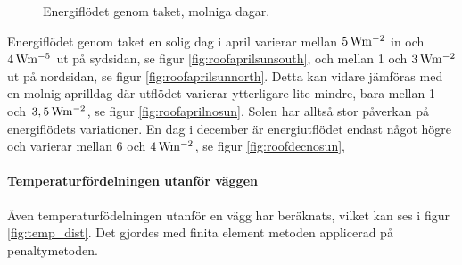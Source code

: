 \begin{figure}[hpbt]
\centering
{}

\caption{\label{fig:rooffigurescloud}Energiflödet genom taket, molniga dagar.}
\end{figure}

Energiflödet genom taket en solig dag i april varierar mellan $\unit[5]{W m^{-2}}$ in och $\unit[4]{W m^{-5}}$ ut på sydsidan, se figur \ref{fig:roofaprilsunsouth}, och mellan 1 och $\unit[3]{W m^{-2}}$ ut på nordsidan, se figur \ref{fig:roofaprilsunnorth}. Detta kan vidare jämföras med en molnig aprilldag där utflödet varierar ytterligare lite mindre, bara mellan 1 och $\unit[3,5]{W m^{-2}}$, se figur \ref{fig:roofaprilnosun}. Solen har alltså stor påverkan på energiflödets variationer. En dag i december är energiutflödet endast något högre och varierar mellan 6 och $\unit[4]{W m^{-2}}$, se figur \ref{fig:roofdecnosun},


\paragraph{Temperaturfördelningen utanför väggen}

Även temperaturfödelningen utanför en vägg har beräknats, vilket kan ses i figur \ref{fig:temp_dist}. Det gjordes med finita element metoden applicerad på penaltymetoden.

